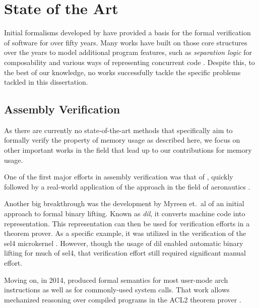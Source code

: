 \section{State of the Art}
Initial formalisms developed by \textcite{floyd1967assigning,hoare1969axiomatic} have provided a basis for the formal verification of software for over fifty years.
Many works have built on those core structures over the years to model additional program features, such as \emph{separation logic} \autocite{reynolds2002separation} for composability and various ways of representing concurrent code \autocite{owicki1976gries,xu1997rely-guarantee}.
Despite this, to the best of our knowledge, no works successfully tackle the specific problems tackled in this dissertation.

\subsection{Assembly Verification}
As there are currently no state-of-the-art methods that specifically aim to formally verify the property of memory usage as described here, we focus on other important works in the field that lead up to our contributions for memory usage.

One of the first major efforts in assembly verification was that of \textcite{clutterbuck1986validation,clutterbuck1988verification}, quickly followed by a real-world application of the approach in the field of aeronautics \autocite{oneill1988verification}.

Another big breakthrough was the development by Myreen et.\ al of an initial approach to formal binary lifting.
Known as \emph{\ac{dil}}, it converts machine code into  representation.
This representation can then be used for verification efforts in a theorem prover.
As a specific example, it was utilized in the verification of the \gls{sel4} microkernel \autocite{klein2009sel4,klein2014comprehensive,sel4}.
However, though the usage of \ac{dil} enabled automatic binary lifting for much of \gls{sel4}, that verification effort still required significant manual effort.

Moving on, in 2014, \textcite{goel2014syscalls,goelphd} produced formal semantics for most user-mode \gls{arch} instructions as well as for commonly-used system calls.
That work allows mechanized reasoning over compiled programs in the ACL2 theorem prover \autocite{ACL2}.

